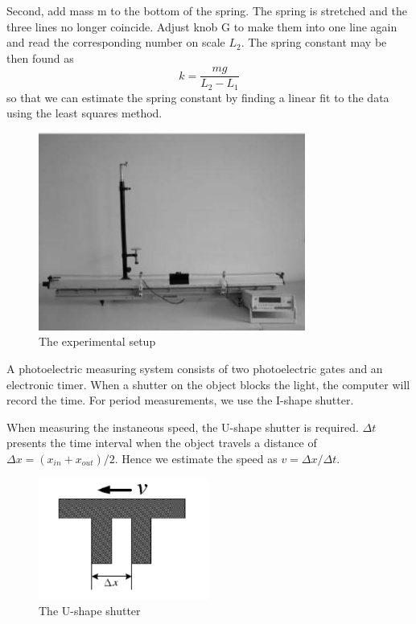     Second, add mass m to the bottom of the spring. The spring is stretched and the three lines no longer coincide. Adjust knob G to make them into one line again and read the corresponding number on scale $L_2$. The spring constant may be then found as
    \begin{equation}
        k=\frac{mg}{L_2-L_1}
    \end{equation}
    so that we can estimate the spring constant by finding a linear fit to the data using the least squares method.\\

    \begin{figure}[h]
        \centering
        \label{airtrack}
        \includegraphics[height=6.5cm]{images/3.png}
        \caption{The experimental setup}
    \end{figure}

    A photoelectric measuring system consists of two photoelectric gates and an electronic timer. When a shutter on the object blocks the light, the computer will record the time. For period measurements, we use the I-shape shutter.

    When measuring the instaneous speed, the U-shape shutter is required. $\Delta t$ presents the time interval when the object travels a distance of $\Delta x=(x_{in}+x_{out})/2$. Hence we estimate the speed as $v=\Delta x/\Delta t$.

    \begin{figure}[h]
        \centering
        \label{U}
        \includegraphics[height=4cm]{images/4.png}
        \caption{The U-shape shutter}
    \end{figure}